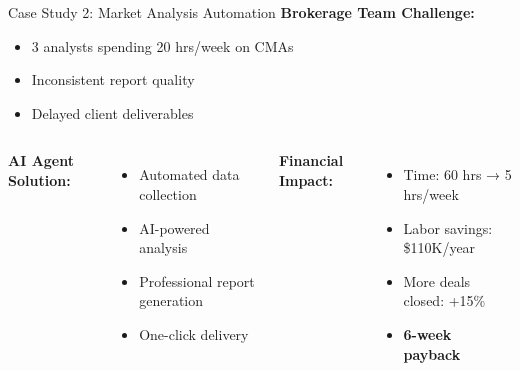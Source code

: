 \documentclass{beamer}
\begin{document}
\begin{frame}{Case Study 2: Market Analysis Automation}
  \textbf{Brokerage Team Challenge:}
  \begin{itemize}
    \item 3 analysts spending 20 hrs/week on CMAs
    \item Inconsistent report quality
    \item Delayed client deliverables
  \end{itemize}
  
  \vspace{0.3cm}
  
  \begin{columns}[onlytextwidth]
      \textbf{AI Agent Solution:}
      \begin{itemize}
        \item Automated data collection
        \item AI-powered analysis
        \item Professional report generation
        \item One-click delivery
      \end{itemize}
    
      \textbf{Financial Impact:}
      \begin{itemize}
        \item Time: 60 hrs → 5 hrs/week
        \item Labor savings: \$110K/year
        \item More deals closed: +15\%
        \item \textbf{6-week payback}
      \end{itemize}
  \end{columns}
\end{frame}
\end{document}
